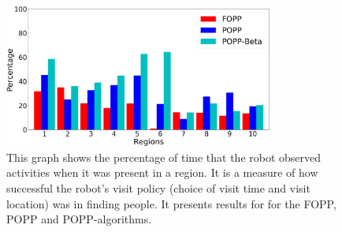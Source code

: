 \begin{figure}[t!]
	\centering
	\includegraphics[width=0.79\textwidth]{./figures/exploration_percentage_region.png}
	\caption{This graph shows the percentage of time that the robot observed activities when it was present in a region. It is a measure of how successful the robot's visit policy (choice of visit time and visit location) was in finding people. It presents results for for the FOPP, POPP and POPP-algorithms. %
	}
	\label{fig:exploration_percentage_region}
\end{figure}



